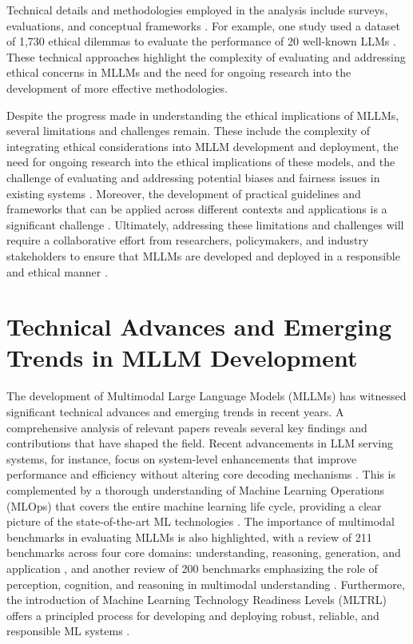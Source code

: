 \documentclass[conference]{IEEEtran}
\begin{document}
Technical details and methodologies employed in the analysis include surveys, evaluations, and conceptual frameworks \cite{b13}. For example, one study used a dataset of 1,730 ethical dilemmas to evaluate the performance of 20 well-known LLMs \cite{b14}. These technical approaches highlight the complexity of evaluating and addressing ethical concerns in MLLMs and the need for ongoing research into the development of more effective methodologies.

Despite the progress made in understanding the ethical implications of MLLMs, several limitations and challenges remain. These include the complexity of integrating ethical considerations into MLLM development and deployment, the need for ongoing research into the ethical implications of these models, and the challenge of evaluating and addressing potential biases and fairness issues in existing systems \cite{b15}. Moreover, the development of practical guidelines and frameworks that can be applied across different contexts and applications is a significant challenge \cite{b16}. Ultimately, addressing these limitations and challenges will require a collaborative effort from researchers, policymakers, and industry stakeholders to ensure that MLLMs are developed and deployed in a responsible and ethical manner \cite{b17}.

\section{Technical Advances and Emerging Trends in MLLM Development}
The development of Multimodal Large Language Models (MLLMs) has witnessed significant technical advances and emerging trends in recent years. A comprehensive analysis of relevant papers reveals several key findings and contributions that have shaped the field. Recent advancements in LLM serving systems, for instance, focus on system-level enhancements that improve performance and efficiency without altering core decoding mechanisms \cite{b1}. This is complemented by a thorough understanding of Machine Learning Operations (MLOps) that covers the entire machine learning life cycle, providing a clear picture of the state-of-the-art ML technologies \cite{b2}. The importance of multimodal benchmarks in evaluating MLLMs is also highlighted, with a review of 211 benchmarks across four core domains: understanding, reasoning, generation, and application \cite{b3}, and another review of 200 benchmarks emphasizing the role of perception, cognition, and reasoning in multimodal understanding \cite{b4}. Furthermore, the introduction of Machine Learning Technology Readiness Levels (MLTRL) offers a principled process for developing and deploying robust, reliable, and responsible ML systems \cite{b5}.
\end{document}
